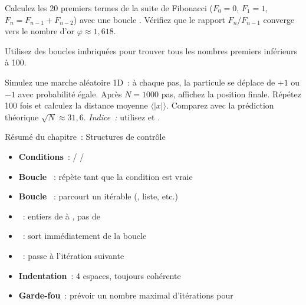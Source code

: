 \begin{exercice}
Calculez les 20 premiers termes de la suite de Fibonacci
($F_0 = 0$, $F_1 = 1$, $F_{n} = F_{n-1} + F_{n-2}$) avec une boucle .
V\'erifiez que le rapport $F_n / F_{n-1}$ converge vers le nombre d'or
$\varphi \approx 1{,}618$.
\end{exercice}

\begin{exercice}
Utilisez des boucles imbriqu\'ees pour trouver tous les nombres premiers
inf\'erieurs \`a 100.
\end{exercice}

\begin{exercice}
Simulez une marche al\'eatoire 1D~: \`a chaque pas, la particule se
d\'eplace de $+1$ ou $-1$ avec probabilit\'e \'egale. Apr\`es $N = 1000$ pas,
affichez la position finale. R\'ep\'etez 100 fois et calculez la distance
moyenne $\langle |x| \rangle$. Comparez avec la pr\'ediction th\'eorique
$\sqrt{N} \approx 31{,}6$.
\emph{Indice~:} utilisez  et .
\end{exercice}

\begin{formules}{R\'esum\'e du chapitre~: Structures de contr\^ole}
\begin{itemize}
    \item \textbf{Conditions}~:  /  / 
    \item \textbf{Boucle }~: r\'ep\`ete tant que la condition est vraie
    \item \textbf{Boucle }~: parcourt un it\'erable (, liste, etc.)
    \item \textbf{}~: entiers de  \`a , pas de 
    \item \textbf{}~: sort imm\'ediatement de la boucle
    \item \textbf{}~: passe \`a l'it\'eration suivante
    \item \textbf{Indentation}~: 4 espaces, toujours coh\'erente
    \item \textbf{Garde-fou}~: pr\'evoir un nombre maximal d'it\'erations pour 
\end{itemize}
\end{formules}
